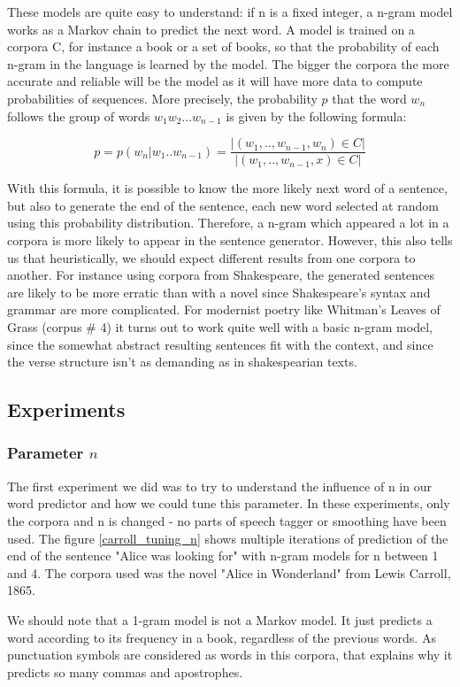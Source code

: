 \documentclass[a4paper,12pt]{article}
\begin{document}
These models are quite easy to understand: if n is a fixed integer, a n-gram model works as a Markov chain to predict the next word. A model is trained on a corpora C, for instance a book or a set of books, so that the probability of each n-gram in the language is learned by the model. The bigger the corpora the more accurate and reliable will be the model as it will have more data to compute probabilities of sequences. More precisely, the probability $p$ that the word $w_n$ follows the group of words $w_1 w_2 ... w_{n-1}$ is given by the following formula:

$$ p = p(w_n | w_1 .. w_{n-1}) = \frac{|{(w_1, .., w_{n-1}, w_n) \in C}|}{|{(w_1, .., w_{n-1}, x) \in C}|} $$

With this formula, it is possible to know the more likely next word of a sentence, but also to generate the end of the sentence, each new word selected at random using this probability distribution. Therefore, a n-gram which appeared a lot in a corpora is more likely to appear in the sentence generator. However, this also tells us that heuristically, we should expect different results from one corpora to another. For instance using corpora from Shakespeare, the generated sentences are likely to be more erratic than with a novel since Shakespeare's syntax and grammar are more complicated. For modernist poetry like Whitman's Leaves of Grass (corpus \# 4) it turns out to work quite well with a basic n-gram model, since the somewhat abstract resulting sentences fit with the context, and since the verse structure isn't as demanding as in shakespearian texts.

\subsection{Experiments}
\subsubsection{Parameter $n$}
	The first experiment we did was to try to understand the influence of n in our word predictor and how we could tune this parameter. In these experiments, only the corpora and n is changed - no parts of speech tagger or smoothing have been used. The figure \ref{carroll_tuning_n} shows multiple iterations of prediction of the end of the sentence "Alice was looking for" with n-gram models for n between 1 and 4. The corpora used was the novel "Alice in Wonderland" from Lewis Carroll, 1865. 
	
We should note that a 1-gram model is not a Markov model. It just predicts a word according to its frequency in a book, regardless of the previous words. As punctuation symbols are considered as words in this corpora, that explains why it predicts so many commas and apostrophes. 
\end{document}
